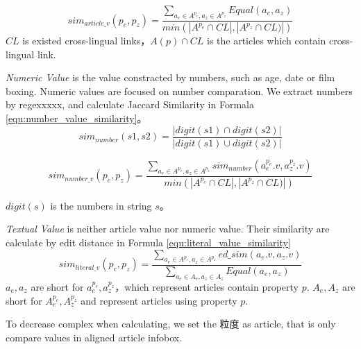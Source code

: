 \documentclass[runningheads,a4paper]{llncs}
\begin{document}
\begin{equation}
\label{equ:article_value_similarity}
sim_{article\_v}(p_e, p_z) = \frac{\sum_{a_e\in A^{p_e}, a_z \in A^{p_z}} Equal(a_e, a_z)}{min(\left| A^{p_e}\cap CL \right|, \left|A^{p_z} \cap CL) \right|)}
\end{equation}
$CL$ is existed cross-lingual links，$A(p)\cap CL$ is the articles which contain cross-lingual link.

\textit{Numeric Value} is the value constracted by numbers, such as age, date or film boxing. Numeric values are focused on number comparation. We extract numbers by regexxxxx, and calculate Jaccard Similarity in Formala \ref{equ:number_value_similarity}。
\begin{equation}
sim_{number}(s1, s2) = \frac { |digit(s1) \cap digit(s2)| }{ |digit(s1) \cup digit(s2)| }
\end{equation}

\begin{equation}
\label{equ:number_value_similarity}
sim_{number\_v}(p_e, p_z) = \frac{\sum_{a_e\in A^{p_e}, a_z \in A^{p_z}} sim_{number}(a_e^{p_e}.v, a_z^{p_z}.v)}{min(\left| A^{p_e}\cap CL \right|, \left|A^{p_z} \cap CL) \right|)}
\end{equation}

$digit(s)$ is the numbers in string $s$。

\textit{Textual Value} is neither article value nor numeric value. Their similarity are calculate by edit distance in Formula \ref{equ:literal_value_similarity}
\begin{equation}
\label{equ:literal_value_similarity}
sim_{literal\_v}(p_e, p_z) = \frac { \sum _{ { a }_{ e }\in { A }^{p_e },{ a }_{ z }\in { A }^{p_z } }{ ed\_sim\left( { a }_{ e }.v,{ a }_{ z }.v \right)  }  }{ \sum _{ { a }_{ e }\in { A }_{ e },{ a }_{ z }\in { A }_{ z } }{ Equal\left( { a }_{ e },{ a }_{ z } \right)  }  }
\end{equation}
$a_e, a_z$ are short for $a_e^{p_e}, a_z^{p_z}$，which represent articles contain property $p$. $A_e, A_z$ are short for $A_e^{p_e},A_z^{p_z}$ and represent articles using property $p$.

To decrease complex when calculating, we set the 粒度 as article, that is only compare values in aligned article infobox.
\end{document}
